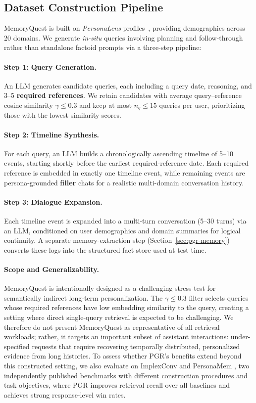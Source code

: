 \subsection{Dataset Construction Pipeline}
MemoryQuest is built on \emph{PersonaLens} profiles~\cite{zhao-etal-2025-personalens}, providing demographics across 20 domains. We generate \emph{in-situ} queries involving planning and follow-through rather than standalone factoid prompts via a three-step pipeline:

\paragraph{Step 1: Query Generation.} 
An LLM generates candidate queries, each including a query date, reasoning, and 3--5 \textbf{required references}. We retain candidates with average query--reference cosine similarity $\gamma \le 0.3$ and keep at most $n_q \le 15$ queries per user, prioritizing those with the lowest similarity scores.

\paragraph{Step 2: Timeline Synthesis.} 
For each query, an LLM builds a chronologically ascending timeline of 5--10 events, starting shortly before the earliest required-reference date. Each required reference is embedded in exactly one timeline event, while remaining events are persona-grounded \textbf{filler} chats for a realistic multi-domain conversation history.

\paragraph{Step 3: Dialogue Expansion.} 
Each timeline event is expanded into a multi-turn conversation (5--30 turns) via an LLM, conditioned on user demographics and domain summaries for logical continuity. A separate memory-extraction step (Section~\ref{sec:pgr-memory}) converts these logs into the structured fact store used at test time.

\paragraph{Scope and Generalizability.}
MemoryQuest is intentionally designed as a challenging stress-test for semantically indirect long-term personalization. The $\gamma \le 0.3$ filter selects queries whose required references have low embedding similarity to the query, creating a setting where direct single-query retrieval is expected to be challenging. We therefore do not present MemoryQuest as representative of all retrieval workloads; rather, it targets an important subset of assistant interactions: under-specified requests that require recovering temporally distributed, personalized evidence from long histories. To assess whether PGR's benefits extend beyond this constructed setting, we also evaluate on ImplexConv \cite{li2025implexconv} and PersonaMem \cite{jiang2025personamem}, two independently published benchmarks with different construction procedures and task objectives, where PGR improves retrieval recall over all baselines and achieves strong response-level win rates.
